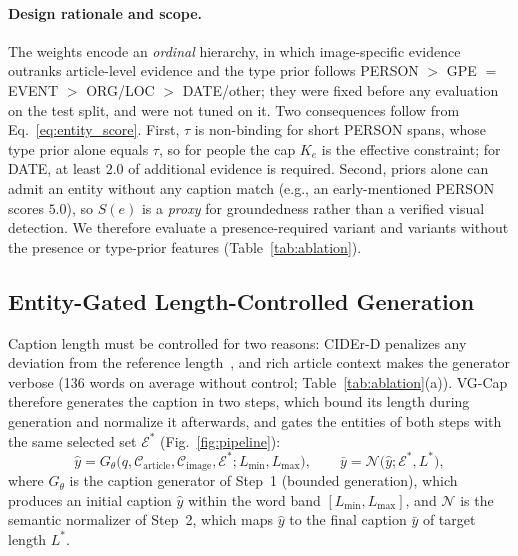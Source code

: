 \documentclass[runningheads]{llncs}
\DeclareRobustCommand{\aciids}[1]{{\color{olive}#1}}
\DeclareRobustCommand{\revise}[1]{{\color{blue}#1}}
\DeclareRobustCommand{\aciids}[1]{#1}
\DeclareRobustCommand{\revise}[1]{#1}
\begin{document}
\revise{\paragraph{Design rationale and scope.} The weights encode an \emph{ordinal} hierarchy, in which image-specific evidence outranks article-level evidence and \aciids{the type prior follows PERSON $>$ GPE \revise{$=$} EVENT $>$ ORG/LOC $>$ DATE/other}; they were fixed before any evaluation on the test split, and were not tuned on it. Two consequences follow from Eq.~\eqref{eq:entity_score}. First, $\tau$ is non-binding for short PERSON spans, whose type prior alone equals $\tau$, so for people the cap $K_e$ is the effective constraint; for DATE, at least $2.0$ of additional evidence is required. Second, priors alone can admit an entity without any caption match (e.g., an early-mentioned PERSON scores $5.0$), so $S(e)$ is a \emph{proxy} for groundedness rather than a verified visual detection. We therefore evaluate a presence-required variant and variants without the presence or type-prior features (Table~\ref{tab:ablation}).}


\subsection{\aciids{Entity-Gated Length-Controlled Generation}}
\label{sec:length_control}

\aciids{Caption length must be controlled for two reasons: CIDEr-D penalizes any deviation from the reference length~\cite{vedantam2015cider}, and rich article context makes the generator verbose (136 words on average without control; Table~\ref{tab:ablation}(a)). VG-Cap therefore generates the caption in two steps, which bound its length during generation and normalize it afterwards, and gates the entities of both steps with the same selected set $\mathcal{E}^{*}$ (Fig.~\ref{fig:pipeline}):}
\begin{equation}
\hat{y}=G_{\theta}\bigl(q,\mathcal{C}_{\mathrm{article}},\mathcal{C}_{\mathrm{image}},\mathcal{E}^{*};L_{\min},L_{\max}\bigr),
\qquad
\bar{y}=\mathcal{N}\bigl(\hat{y};\mathcal{E}^{*},L^{*}\bigr),
\label{eq:length_pipeline}
\end{equation}
\aciids{where $G_{\theta}$ is the caption generator of Step~1 (bounded generation), which produces an initial caption $\hat{y}$ within the word band $[L_{\min},L_{\max}]$, and $\mathcal{N}$ is the semantic normalizer of Step~2, which maps $\hat{y}$ to the final caption $\bar{y}$ of target length $L^{*}$.}
\end{document}
